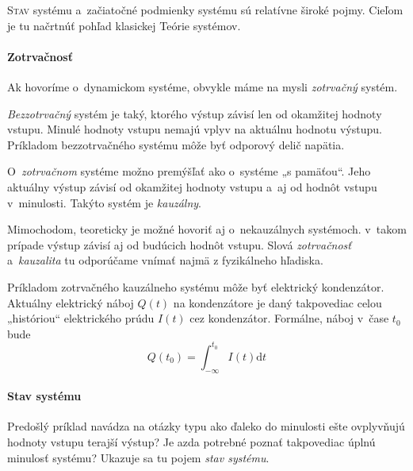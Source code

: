 \documentclass[a4paper, 10pt, ]{article}
\begin{document}
\bigskip

\normalsize
\normalfont












\noindent
\lettrine[lines=1, nindent=1pt, loversize=0.0]{S}{tav} 
systému a~začiatočné podmienky systému sú relatívne široké pojmy. Cieľom je tu načrtnúť pohľad klasickej Teórie systémov.



\paragraph{Zotrvačnosť}

Ak hovoríme o~dynamickom systéme, obvykle máme na mysli \emph{zotrvačný} systém.

\emph{Bezzotrvačný} systém je taký, ktorého výstup závisí len od okamžitej hodnoty vstupu. Minulé hodnoty vstupu nemajú vplyv na aktuálnu hodnotu výstupu. Príkladom bezzotrvačného systému môže byť odporový delič napätia.

O~\emph{zotrvačnom} systéme možno premýšľať ako o~systéme „s pamäťou“. Jeho aktuálny výstup závisí od okamžitej hodnoty vstupu a~aj od hodnôt vstupu v~minulosti. Takýto systém je \emph{kauzálny}.


Mimochodom, teoreticky je možné hovoriť aj o~nekauzálnych systémoch. v~takom prípade výstup závisí aj od budúcich hodnôt vstupu. Slová \emph{zotrvačnosť} a~\emph{kauzalita} tu odporúčame vnímať najmä z fyzikálneho hľadiska.

Príkladom zotrvačného kauzálneho systému môže byť elektrický kondenzátor. Aktuálny elektrický náboj $Q(t)$ na kondenzátore je daný takpovediac celou „históriou“ elektrického prúdu $I(t)$ cez kondenzátor. Formálne, náboj v~čase $t_0$ bude
\begin{equation}
    Q(t_0) = \int_{-\infty}^{t_0}I(t) \text{d}t
\end{equation}


\paragraph{Stav systému}

Predošlý príklad navádza na otázky typu ako ďaleko do minulosti ešte ovplyvňujú hodnoty vstupu terajší výstup? Je azda potrebné poznať takpovediac úplnú minulosť systému? Ukazuje sa tu pojem \emph{stav systému}.
\end{document}
